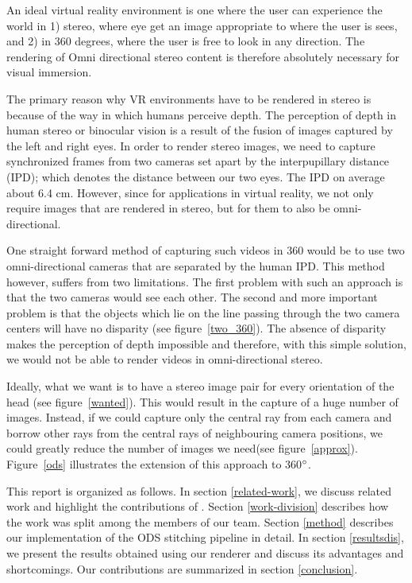 \documentclass[10pt,twocolumn,letterpaper]{article}
\begin{document}
An ideal virtual reality environment is one where the user can experience the world in 1) stereo, where eye get an image appropriate to where the user is sees, and 2) in 360 degrees, where the user is free to look in any direction. The rendering of Omni directional stereo content is therefore absolutely necessary for visual immersion. 

The primary reason why VR environments have to be rendered in stereo is because of the way in which humans perceive depth. The perception of depth in human stereo or binocular vision is a result of the fusion of images captured by the left and right eyes. 
In order to render stereo images, we need to capture synchronized frames from two cameras set apart by the interpupillary distance (IPD); which denotes the distance between our two eyes. The IPD on average about 6.4 cm. However, since for applications in virtual reality, we not only require images that are rendered in stereo, but for them to also be omni-directional. 

One straight forward method of capturing such videos in 360 would be to use two omni-directional cameras that are separated by the human IPD. This method however, suffers from two limitations. The first problem with such an approach is that the two cameras would see each other. The second and more important problem is that the objects which lie on the line passing through the two camera centers will have no disparity (see figure~\ref{two_360}). The absence of disparity makes the perception of depth impossible and therefore, with this simple solution, we would not be able to render  videos in omni-directional stereo.

Ideally, what we want is to have a stereo image pair for every orientation of the head (see figure~\ref{wanted}). This would result in the capture of a huge number of images. Instead, if we could capture only the central ray from each camera and borrow other rays from the central rays of neighbouring camera positions, we could greatly reduce the number of images we need(see figure~\ref{approx}). Figure~\ref{ods} illustrates the extension of this approach to 360$\degree$.

This report is organized as follows. In section \ref{related-work}, we discuss related work and highlight the contributions of \cite{jump16}. Section \ref{work-division} describes how the work was split among the members of our team. Section \ref{method} describes our implementation of the ODS stitching pipeline in detail. In section \ref{resultsdis}, we present the results obtained using our renderer and discuss its advantages and shortcomings. Our contributions are summarized in section \ref{conclusion}.
\end{document}
